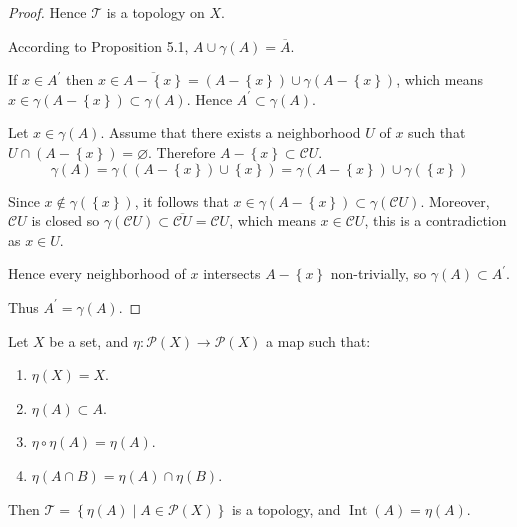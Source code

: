 \begin{proof}
    Hence \( \mathscr{T} \) is a topology on \(X\).

    According to Proposition 5.1, \( A \cup \gamma(A) = \overline{A} \).

    If \( x \in A^{\prime} \) then \( x \in \overline{A - \left\{x\right\}} = (A - \left\{x\right\}) \cup \gamma(A - \left\{x\right\}) \), which means \( x \in \gamma(A - \left\{x\right\}) \subset \gamma(A) \). Hence \( A^{\prime} \subset \gamma(A) \).

    Let \( x \in \gamma(A) \). Assume that there exists a neighborhood \(U\) of \(x\) such that \( U \cap (A - \left\{x\right\}) = \varnothing \). Therefore \( A - \left\{x\right\} \subset \mathscr{C}U \).
    \[
        \gamma(A) = \gamma((A - \left\{x\right\}) \cup \left\{x\right\}) = \gamma(A - \left\{x\right\}) \cup \gamma(\left\{x\right\})
    \]

    Since \( x \notin \gamma(\left\{x\right\}) \), it follows that \( x \in \gamma(A - \left\{ x \right\}) \subset \gamma(\mathscr{C}U) \). Moreover, \( \mathscr{C}U \) is closed so \( \gamma(\mathscr{C}U) \subset \overline{\mathscr{C}U} = \mathscr{C}U \), which means \( x \in \mathscr{C}U \), this is a contradiction as \( x \in U \).

    Hence every neighborhood of \(x\) intersects \( A - \left\{x\right\} \) non-trivially, so \( \gamma(A) \subset A^{\prime} \).

    Thus \( A^{\prime} = \gamma(A) \).
\end{proof}

\begin{proposition}{5.3}
    Let \(X\) be a set, and \( \eta: \mathscr{P}(X) \to \mathscr{P}(X) \) a map such that:
    \begin{enumerate}[label={(\arabic*)}]
        \item \( \eta(X) = X \).
        \item \( \eta(A) \subset A \).
        \item \( \eta \circ \eta(A) = \eta(A) \).
        \item \( \eta(A \cap B) = \eta(A) \cap \eta(B) \).
    \end{enumerate}

    Then \( \mathscr{T} = \left\{ \eta(A) \mid A \in \mathscr{P}(X) \right\} \) is a topology, and \( \operatorname{Int}(A) = \eta(A) \).
\end{proposition}

